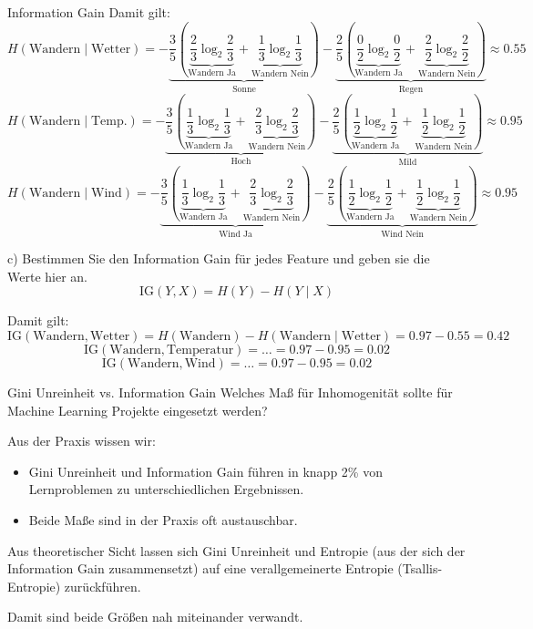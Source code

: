 \begin{example}{Information Gain}
    Damit gilt:
    \[
        H(\text{Wandern} \mid \text{Wetter})
        = - \underbrace{\frac{3}{5} \left( \underbrace{\frac{2}{3} \log_2 \frac{2}{3}}_{\text{Wandern Ja}} + \underbrace{\frac{1}{3} \log_2 \frac{1}{3}}_{\text{Wandern Nein}} \right)}_{\text{Sonne}}
        - \underbrace{\frac{2}{5} \left( \underbrace{\frac{0}{2} \log_2 \frac{0}{2}}_{\text{Wandern Ja}} + \underbrace{\frac{2}{2} \log_2 \frac{2}{2}}_{\text{Wandern Nein}} \right)}_{\text{Regen}}
        \approx 0.55
    \]
    \[
        H(\text{Wandern} \mid \text{Temp.})
        = - \underbrace{\frac{3}{5} \left( \underbrace{\frac{1}{3} \log_2 \frac{1}{3}}_{\text{Wandern Ja}} + \underbrace{\frac{2}{3} \log_2 \frac{2}{3}}_{\text{Wandern Nein}} \right)}_{\text{Hoch}}
        - \underbrace{\frac{2}{5} \left( \underbrace{\frac{1}{2} \log_2 \frac{1}{2}}_{\text{Wandern Ja}} + \underbrace{\frac{1}{2} \log_2 \frac{1}{2}}_{\text{Wandern Nein}} \right)}_{\text{Mild}}
        \approx 0.95
    \]
    \[
        H(\text{Wandern} \mid \text{Wind})
        = - \underbrace{\frac{3}{5} \left( \underbrace{\frac{1}{3} \log_2 \frac{1}{3}}_{\text{Wandern Ja}} + \underbrace{\frac{2}{3} \log_2 \frac{2}{3}}_{\text{Wandern Nein}} \right)}_{\text{Wind Ja}}
        - \underbrace{\frac{2}{5} \left( \underbrace{\frac{1}{2} \log_2 \frac{1}{2}}_{\text{Wandern Ja}} + \underbrace{\frac{1}{2} \log_2 \frac{1}{2}}_{\text{Wandern Nein}} \right)}_{\text{Wind Nein}}
        \approx 0.95
    \]

    c) Bestimmen Sie den Information Gain für jedes Feature und geben sie die Werte hier an.
    \[
        \text{IG}(Y, X) = H(Y) - H(Y \mid X)
    \]

    Damit gilt:
    \[
        \text{IG}(\text{Wandern}, \text{Wetter}) = H(\text{Wandern}) - H(\text{Wandern} \mid \text{Wetter})
        = 0.97 - 0.55 = 0.42
    \]
    \[
        \text{IG}(\text{Wandern}, \text{Temperatur}) = \ldots
        = 0.97 - 0.95 = 0.02
    \]
    \[
        \text{IG}(\text{Wandern}, \text{Wind}) = \ldots
        = 0.97 - 0.95 = 0.02
    \]
\end{example}

\begin{bonus}{Gini Unreinheit vs. Information Gain}
    Welches Maß für Inhomogenität sollte für Machine Learning Projekte eingesetzt werden?

    Aus der Praxis wissen wir:
    \begin{itemize}
        \item Gini Unreinheit und Information Gain führen in knapp 2\% von Lernproblemen zu unterschiedlichen Ergebnissen.
        \item Beide Maße sind in der Praxis oft austauschbar.
    \end{itemize}

    Aus theoretischer Sicht lassen sich Gini Unreinheit und Entropie (aus der sich der Information Gain zusammensetzt) auf eine verallgemeinerte Entropie (Tsallis-Entropie) zurückführen.

    Damit sind beide Größen nah miteinander verwandt.
\end{bonus}

